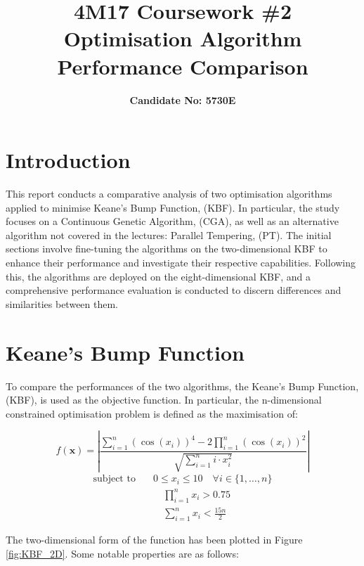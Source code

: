 \documentclass[10pt]{article}
\title{\textbf{4M17 Coursework \#2 \\ Optimisation Algorithm Performance Comparison}}
\author{\textbf{Candidate No: 5730E}}
\begin{document}
\vspace{-3cm}
\maketitle
\begin{multicols}{2}
\section{Introduction}
This report conducts a comparative analysis of two optimisation algorithms applied to minimise Keane's Bump Function, (KBF). In particular, the study focuses on a Continuous Genetic Algorithm, (CGA), as well as an alternative algorithm not covered in the lectures: Parallel Tempering, (PT). The initial sections involve fine-tuning the algorithms on the two-dimensional KBF to enhance their performance and investigate their respective capabilities. Following this, the algorithms are deployed on the eight-dimensional KBF, and a comprehensive performance evaluation is conducted to discern differences and similarities between them. 

\section{Keane's Bump Function}

To compare the performances of the two algorithms, the Keane's Bump Function, (KBF), is used as the objective function. In particular, the n-dimensional constrained optimisation problem is defined as the maximisation of:

\begin{equation}
    f(\mathbf{x}) = \left| \frac{\sum_{i=1}^{n} (\cos(x_i))^4 - 2\prod_{i=1}^{n} (\cos(x_i))^2}{\sqrt{\sum_{i=1}^{n} i \cdot x_i^2}} \right|
    \label{eq:KBF_cost}
\end{equation}
\begin{equation}
    \begin{aligned}
        \text{subject to} \quad & 0 \leq x_i \leq 10 \quad \forall i \in \{1, \dots, n\} \\
        & \quad \prod_{i=1}^{n} x_i > 0.75 \\
        & \quad \sum_{i=1}^{n} x_i < \frac{15n}{2}
    \end{aligned} 
    \label{eq:KBF_constraints}
\end{equation}

The two-dimensional form of the function has been plotted in Figure \ref{fig:KBF_2D}. Some notable properties are as follows:


\end{multicols}
\end{document}
